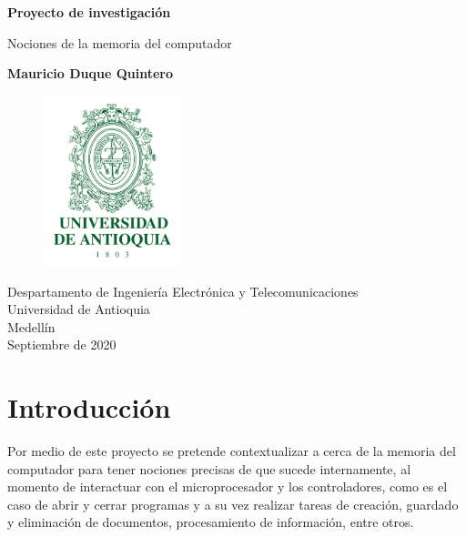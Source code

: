 \documentclass{article}
\begin{document}
\begin{titlepage}
    \begin{center}
        \vspace*{1cm}
            
        \Huge
        \textbf{Proyecto de investigación }
            
        \vspace{0.5cm}
        \LARGE
        Nociones de la memoria del computador
            
        \vspace{2.5cm}
            
        \textbf{Mauricio Duque Quintero }
            
        \vfill
        \begin{figure}[h]
        \includegraphics[width=4cm]{Escudo-UdeA.png}
        \centering
        \label{fig:descarga}
        \end{figure}
     
        \vspace{0.8cm}
            
        \Large
        Despartamento de Ingeniería Electrónica y Telecomunicaciones\\
        Universidad de Antioquia\\
        Medellín\\
        Septiembre de 2020
            
    \end{center}
\end{titlepage}

\tableofcontents

\section{Introducción}
Por medio de este proyecto se pretende contextualizar a cerca de la memoria del computador para tener nociones precisas de que sucede internamente, al momento de interactuar con el microprocesador y los controladores, como es el caso de abrir y cerrar programas y a su vez  realizar tareas de creación, guardado y eliminación de documentos, procesamiento de información, entre otros. 
\end{document}
